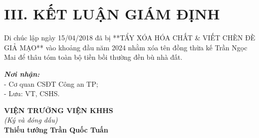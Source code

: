 \documentclass[12pt,a4paper]{article}
\begin{document}
\section*{III. KẾT LUẬN GIÁM ĐỊNH}
Di chúc lập ngày 15/04/2018 đã bị **TẨY XÓA HÓA CHẤT & VIẾT CHÈN ĐÈ GIẢ MẠO** vào khoảng đầu năm 2024 nhằm xóa tên đồng thừa kế Trần Ngọc Mai để thâu tóm toàn bộ tiền bồi thường đền bù nhà đất.

\vspace{0.8cm}

\noindent
\begin{minipage}[t]{0.45\textwidth}
    \small
    \textbf{\textit{Nơi nhận:}}\\
    - Cơ quan CSĐT Công an TP;\\
    - Lưu: VT, CSHS.
\end{minipage}
\hfill
\begin{minipage}[t]{0.5\textwidth}
    \begin{center}
        \small
        \textbf{VIỆN TRƯỞNG VIỆN KHHS}\\
        \textit{(Ký và đóng dấu)}\\[1.5cm]
        \textbf{Thiếu tướng Trần Quốc Tuấn}
    \end{center}
\end{minipage}
\end{document}
